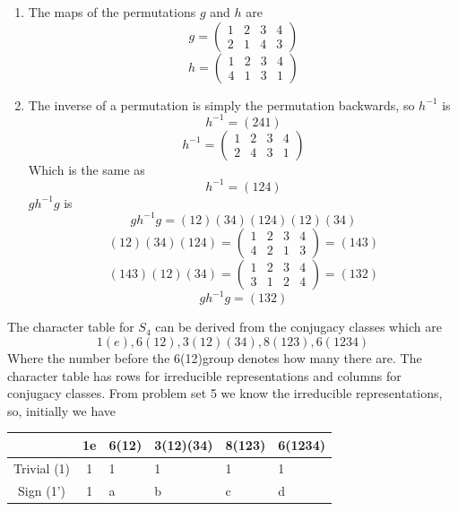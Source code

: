 \documentclass[12pt]{article}
\newcounter{alplisti}
\renewcommand{\thealplisti}{\alph{alplisti}}
\newenvironment{alplist}[1][(\thealplisti)]{\begin{list}{{\rm #1}\ }{ %
      \usecounter{alplisti} %
    \setlength{\itemsep}{0pt}
    \setlength{\parsep}{0pt}  %
     \setlength{\topsep}{0pt} %
}}{\end{list}}
\begin{document}
\begin{alplist}
 \begin{enumerate}
  \item  The maps of the permutations $g$ and $h$ are
  \[
   g= \begin{pmatrix}
     1 & 2 & 3 & 4 \\ 2 & 1 & 4 & 3
    \end{pmatrix}
   \]
   \[
   h= \begin{pmatrix}
     1 & 2 & 3 & 4 \\ 4 & 1 & 3 & 1
    \end{pmatrix}
   \]
  \item 
The inverse of a permutation is simply the permutation backwards, so $h^{-1}$ is 
\[
  h^{-1} = (241)
 \]
 \[
  h^{-1}= \begin{pmatrix}
    1 & 2 & 3 & 4 \\ 2 & 4 & 3 & 1
   \end{pmatrix}
  \]
  Which is the same as 
  \[
  h^{-1} = (124)
 \]
 $g h^{-1} g$ is 
 \[
  g h^{-1} g = (12)(34)(124)(12)(34)
 \]
$$
(12)(34)(124) = \begin{pmatrix}
  1 & 2 & 3 & 4 \\ 4 & 2 & 1 & 3
 \end{pmatrix} = (143)
 $$
$$ (143)(12)(34) = \begin{pmatrix}
  1 & 2 & 3 & 4 \\ 3 & 1 & 2 & 4
 \end{pmatrix} = (132) $$
 \[
  g h^{-1} g = (132)
 \]
 \end{enumerate}
 \item The character table for $S_4$ can be derived from the conjugacy classes which are 
 $$ 1(e), 6(12), 3(12)(34), 8(123), 6(1234) $$
 Where the number before the 6(12)group denotes how many there are. The character table has rows for irreducible representations and columns for conjugacy classes. From problem set 5 we know the irreducible representations, so, initially we have 
 \begin{table}[h]
  \centering
  \begin{tabular}{l|l|l|l|l|l|}
  \cline{2-6}
  \multicolumn{1}{c|}{}                                   & \multicolumn{1}{c|}{1e} & 6(12) & 3(12)(34) & 8(123) & 6(1234) \\ \hline
  \multicolumn{1}{|c|}{Trivial (1)}                       & \multicolumn{1}{c|}{1}  & 1     & 1         & 1      & 1       \\ \hline
  \multicolumn{1}{|c|}{Sign (1')}                         & \multicolumn{1}{c|}{1}  & a     & b         & c      & d       \\ \hline

\end{tabular}
\end{table}
\end{alplist}
\end{document}
